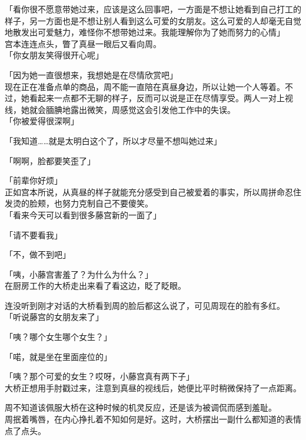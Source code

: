「看你很不愿意带她过来，应该是这么回事吧，一方面是不想让她看到自己打工的样子，另一方面也是不想让别人看到这么可爱的女朋友。这么可爱的人却毫无自觉地散发出可爱魅力，难怪你不想带她过来。我能理解你为了她而努力的心情」\\

宫本连连点头，瞥了真昼一眼后又看向周。\\

「你女朋友笑得很开心呢」

「因为她一直很想来，我想她是在尽情欣赏吧」\\

现在正在准备点单的商品，周不能一直陪在真昼身边，所以让她一个人等着。不过，她看起来一点都不无聊的样子，反而可以说是正在尽情享受。两人一对上视线，她就会腼腆地露出微笑，周感觉这会引发他工作中的失误。\\

「你被爱得很深啊」

「我知道……就是太明白这个了，所以才尽量不想叫她过来」

「啊啊，脸都要笑歪了」

「前辈你好烦」\\

正如宫本所说，从真昼的样子就能充分感受到自己被爱着的事实，所以周拼命忍住发烫的脸颊，也努力克制自己不要傻笑。\\

「看来今天可以看到很多藤宫新的一面了」

「请不要看我」

「不，做不到吧」

「咦，小藤宫害羞了？为什么为什么？」\\

在厨房工作的大桥走出来看了看这边，眨了眨眼。

连没听到刚才对话的大桥看到周的脸后都这么说了，可见周现在的脸有多红。\\

「听说藤宫的女朋友来了」

「咦？哪个女生哪个女生？」

「喏，就是坐在里面座位的」

「咦？那个可爱的女生？哎呀，小藤宫真有两下子」\\

大桥正想用手肘戳过来，注意到真昼的视线后，她便比平时稍微保持了一点距离。

周不知道该佩服大桥在这种时候的机灵反应，还是该为被调侃而感到羞耻。\\

周抿着嘴唇，在内心挣扎着不知如何是好。这时，大桥摆出一副什么都知道的表情点了点头。\\


